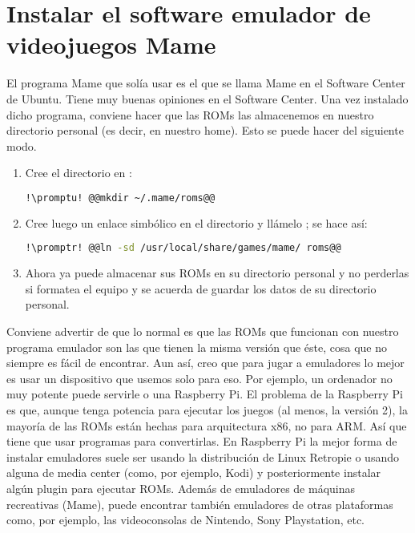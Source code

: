 \section{Instalar el software emulador de videojuegos Mame}\label{sec:mame}
El programa Mame que solía usar es el que se llama Mame en el Software Center de Ubuntu. Tiene muy buenas
opiniones en el Software Center. Una vez instalado dicho programa, conviene hacer que las ROMs las almacenemos
en nuestro directorio personal (es decir, en nuestro home). Esto se puede hacer del siguiente modo.

\begin{enumerate}

  \item Cree el directorio  en :

    \begin{lstlisting}[gobble=6,language=bash,style=bashinteract,escapechar=!]
      !\promptu! @@mkdir ~/.mame/roms@@
    \end{lstlisting}

  \item Cree luego un enlace simbólico en el directorio  y llámelo
    ; se hace así:

    \begin{lstlisting}[gobble=6,language=bash,style=bashinteract,escapechar=!]
      !\promptr! @@ln -sd /usr/local/share/games/mame/ roms@@
    \end{lstlisting}

  \item Ahora ya puede almacenar sus ROMs en su directorio personal y no perderlas si formatea el equipo y se
    acuerda de guardar los datos de su directorio personal.

\end{enumerate}

Conviene advertir de que lo normal es que las ROMs que funcionan con nuestro programa emulador son las que
tienen la misma versión que éste, cosa que no siempre es fácil de encontrar. Aun así, creo que para jugar a
emuladores lo mejor es usar un dispositivo que usemos solo para eso. Por ejemplo, un ordenador no muy potente
puede servirle o una Raspberry Pi. El problema de la Raspberry Pi es que, aunque tenga potencia para ejecutar
los juegos (al menos, la versión 2), la mayoría de las ROMs están hechas para arquitectura x86, no para ARM. Así
que tiene que usar programas para convertirlas. En Raspberry Pi la mejor forma de instalar emuladores suele ser
usando la distribución de Linux Retropie o usando alguna de media center (como, por ejemplo, Kodi) y
posteriormente instalar algún plugin para ejecutar ROMs. Además de emuladores de máquinas recreativas (Mame),
puede encontrar también emuladores de otras plataformas como, por ejemplo, las videoconsolas de Nintendo, Sony
Playstation, etc.
